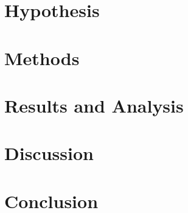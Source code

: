 \documentclass{proc}
\begin{document}
\section{Hypothesis}

\section{Methods}
\section{Results and Analysis}

\section{Discussion}

\section{Conclusion}




\end{document}
